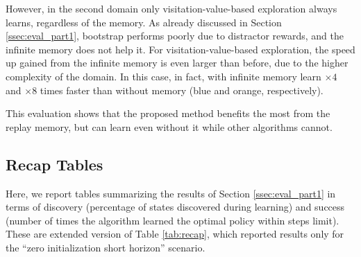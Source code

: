 \documentclass{article}
\begin{document}
However, in the second domain only visitation-value-based exploration always learns, regardless of the memory. As already discussed in Section \ref{ssec:eval_part1}, bootstrap performs poorly due to distractor rewards, and the infinite memory does not help it.
For visitation-value-based exploration, the speed up gained from the infinite memory is even larger than before, due to the higher complexity of the domain. In this case, in fact, with infinite memory learn $\times 4$ and $\times 8$ times faster than without memory (blue and orange, respectively).

This evaluation shows that the proposed method benefits the most from the replay memory, but can learn even without it while other algorithms cannot.


\clearpage

\subsection{Recap Tables}
Here, we report tables summarizing the results of Section \ref{ssec:eval_part1} in terms of discovery (percentage of states discovered during learning) and success (number of times the algorithm learned the optimal policy within steps limit). These are extended version of Table \ref{tab:recap}, which reported results only for the ``zero initialization short horizon'' scenario.
\end{document}
